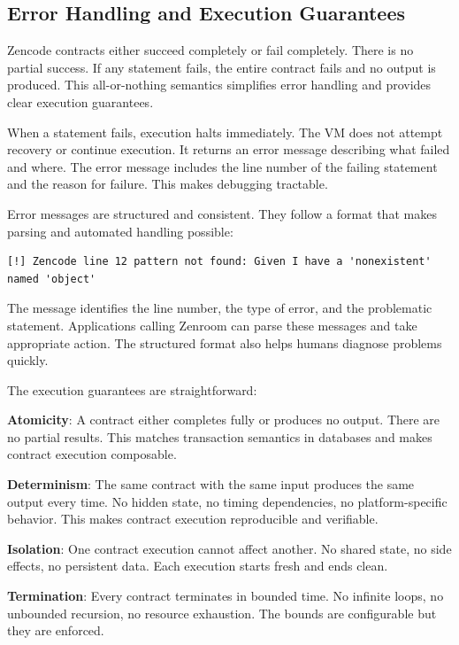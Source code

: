 \subsection{Error Handling and Execution Guarantees}

Zencode contracts either succeed completely or fail completely. There
is no partial success. If any statement fails, the entire contract
fails and no output is produced. This all-or-nothing semantics
simplifies error handling and provides clear execution guarantees.

When a statement fails, execution halts immediately. The VM does not
attempt recovery or continue execution. It returns an error message
describing what failed and where. The error message includes the line
number of the failing statement and the reason for failure. This makes
debugging tractable.

Error messages are structured and consistent. They follow a format
that makes parsing and automated handling possible:

\begin{verbatim}
[!] Zencode line 12 pattern not found: Given I have a 'nonexistent'
named 'object'
\end{verbatim}

The message identifies the line number, the type of error, and the
problematic statement. Applications calling Zenroom can parse these
messages and take appropriate action. The structured format also helps
humans diagnose problems quickly.

The execution guarantees are straightforward:

\textbf{Atomicity}: A contract either completes fully or produces no
output. There are no partial results. This matches transaction
semantics in databases and makes contract execution composable.

\textbf{Determinism}: The same contract with the same input produces
the same output every time. No hidden state, no timing dependencies,
no platform-specific behavior. This makes contract execution
reproducible and verifiable.

\textbf{Isolation}: One contract execution cannot affect another. No
shared state, no side effects, no persistent data. Each execution
starts fresh and ends clean.

\textbf{Termination}: Every contract terminates in bounded time. No
infinite loops, no unbounded recursion, no resource exhaustion. The
bounds are configurable but they are enforced.

